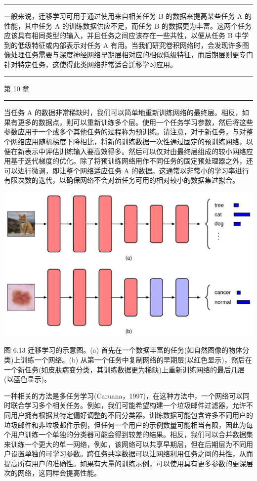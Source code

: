 \documentclass[10pt]{article}
\newcommand{\HRule}{\begin{center}\rule{0.9\linewidth}{0.2mm}\end{center}}
\begin{document}
\HRule

一般来说，迁移学习可用于通过使用来自相关任务 B 的数据来提高某些任务 A 的性能，其中任务 A 的训练数据供应不足，而任务 B 的数据更为丰富。这两个任务应该具有相同类型的输入，并且任务之间应该存在一些共性，以便从任务 B 中学到的低级特征或内部表示对任务 A 有用。当我们研究卷积网络时，会发现许多图像处理任务需要与深度神经网络早期层相对应的相似低级特征，而后期层则更专门针对特定任务，这使得此类网络非常适合迁移学习应用。

\HRule

第 10 章

\HRule

当任务 A 的数据非常稀缺时，我们可以简单地重新训练网络的最终层。相反，如果有更多的数据点，则可以重新训练多个层。使用一个任务学习参数，然后将这些参数应用于一个或多个其他任务的过程称为预训练。请注意，对于新任务，与对整个网络应用随机梯度下降相比，将新的训练数据一次性通过固定的预训练网络，以便在新表示中评估训练输入要高效得多。然后可以仅对由最终层组成的较小网络应用基于迭代梯度的优化。除了将预训练网络用作不同任务的固定预处理器之外，还可以进行微调，即让整个网络适应任务 A 的数据。这通常以非常小的学习率进行有限次数的迭代，以确保网络不会对新任务可用的相对较小的数据集过拟合。

\begin{center}
\includegraphics[max width=1.0\textwidth]{images/0194e279-9b28-703a-88f4-c3ac21e2010d_209_268_340_1262_731_0.jpg}
\end{center}
\hspace*{3em} 

图 6.13 迁移学习的示意图。(a) 首先在一个数据丰富的任务(如自然图像的物体分类)上训练一个网络。(b) 从第一个任务中复制网络的早期层(以红色显示)，然后在一个新任务(如皮肤病变分类，其训练数据更为稀缺)上重新训练网络的最后几层(以蓝色显示)。

一种相关的方法是多任务学习(Caruana，1997)，在这种方法中，一个网络可以同时联合学习多个相关任务。例如，我们可能希望构建一个垃圾邮件过滤器，允许不同用户拥有根据其特定偏好调整的不同分类器。训练数据可能包含许多不同用户的垃圾邮件和非垃圾邮件示例，但任何一个用户的示例数量可能相当有限，因此为每个用户训练一个单独的分类器可能会得到较差的结果。相反，我们可以合并数据集来训练一个更大的单一网络，例如，该网络可以共享早期层，但在后期层为不同用户设置单独的可学习参数。跨任务共享数据可以让网络利用任务之间的共性，从而提高所有用户的准确性。如果有大量的训练示例，可以使用具有更多参数的更深层次的网络，这同样会提高性能。
\end{document}
